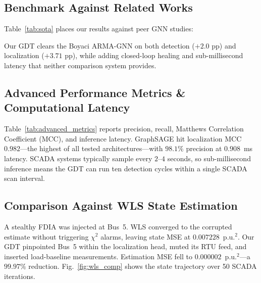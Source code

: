 \documentclass[conference]{IEEEtran}
\begin{document}
\subsection{Benchmark Against Related Works}
Table~\ref{tab:sota} places our results against peer GNN studies:

\begin{table}[htbp]
  \caption{Performance Benchmarking Against Related Works}
  \label{tab:sota}
  \centering
\end{table}

Our GDT clears the Boyaci ARMA-GNN on both detection ($+2.0$ pp) and localization ($+3.71$ pp), while adding closed-loop healing and sub-millisecond latency that neither comparison system provides.

\subsection{Advanced Performance Metrics \& Computational Latency}
Table~\ref{tab:advanced_metrics} reports precision, recall, Matthews Correlation Coefficient (MCC), and inference latency. GraphSAGE hit localization MCC $0.982$---the highest of all tested architectures---with $98.1\%$ precision at $0.908$~ms latency. SCADA systems typically sample every $2$--$4$ seconds, so sub-millisecond inference means the GDT can run ten detection cycles within a single SCADA scan interval.

\subsection{Comparison Against WLS State Estimation}
A stealthy FDIA was injected at Bus~5. WLS converged to the corrupted estimate without triggering $\chi^2$ alarms, leaving state MSE at $0.007228$~p.u.$^2$. Our GDT pinpointed Bus~5 within the localization head, muted its RTU feed, and inserted load-baseline measurements. Estimation MSE fell to $0.000002$~p.u.$^2$---a $99.97\%$ reduction. Fig.~\ref{fig:wls_comp} shows the state trajectory over 50 SCADA iterations.
\end{document}
